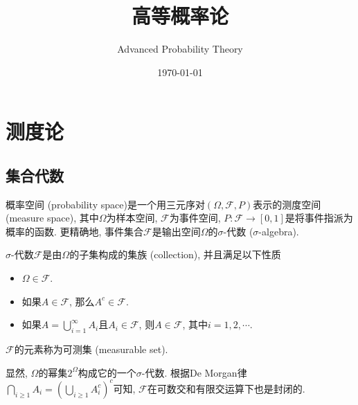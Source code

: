 \documentclass[cn, 12pt, math=mtpro2, bibstyle=apa, blue, twocol]{elegantbook}
\title{高等概率论 }
\subtitle{Advanced Probability Theory}
\date{\today}
\newcommand{\F}{\mathcal{F}}
\newcommand{\PP}{P}
\begin{document}
\maketitle
\frontmatter

\tableofcontents

\mainmatter

\chapter{测度论}
\section{集合代数}

概率空间 (probability space)是一个用三元序对$(\Omega,\F,\PP)$表示的测度空间 (measure space), 其中$\Omega$为样本空间, $\F$为事件空间, $\PP:\F\to[0,1]$是将事件指派为概率的函数. 更精确地, 事件集合$\F$是输出空间$\Omega$的$\sigma$-代数 ($\sigma$-algebra).

\begin{definition}
$\sigma$-代数$\F$是由$\Omega$的子集构成的集族 (collection), 并且满足以下性质
\begin{itemize}
  \item $\Omega\in\F$.
  \item 如果$A\in\F$, 那么$A^c\in\F$.
  \item 如果$A=\bigcup_{i=1}^\infty A_i$且$A_i\in\F$, 则$A\in\F$, 其中$i=1,2,\cdots$.
\end{itemize}
$\F$的元素称为可测集 (measurable set).
\end{definition}

显然, $\Omega$的幂集$2^\Omega$构成它的一个$\sigma$-代数. 根据De Morgan律$\bigcap_{i\ge1} A_i=(\bigcup_{i\ge1} A_i^c)^c$可知, $\F$在可数交和有限交运算下也是封闭的.
\end{document}
